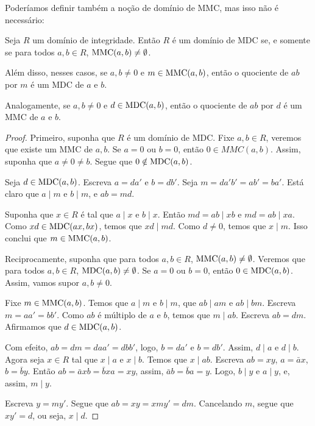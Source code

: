 Poderíamos definir também a noção de domínio de MMC, mas isso não é necessário:

\begin{prop}
    Seja $R$ um domínio de integridade.
    Então $R$ é um domínio de MDC se, e somente se para todos $a, b \in R$, $\operatorname{MMC}(a, b)\neq \emptyset$.

    Além disso, nesses casos, se $a, b \neq 0$ e $m\in \operatorname{MMC}(a, b)$, então o quociente de $ab$ por $m$ é um MDC de $a$ e $b$.

    Analogamente, se $a, b \neq 0$ e $d\in \operatorname{MDC}(a, b)$, então o quociente de $ab$ por $d$ é um MMC de $a$ e $b$.
\end{prop}

\begin{proof}
    Primeiro, suponha que $R$ é um domínio de MDC.
    Fixe $a, b \in R$,
    veremos que existe um MMC de $a, b$.
    Se $a=0$ ou $b=0$, então $0 \in MMC(a, b)$.
    Assim, suponha que $a\neq 0\neq b$.
    Segue que $0 \notin \operatorname{MDC}(a, b)$.

    Seja $d \in \operatorname{MDC}(a, b)$.
    Escreva $a=da'$ e $b=db'$.
    Seja $m=da'b'=ab'=ba'$.
    Está claro que $a\mid m$ e $b\mid m$, e $ab=md$.

    Suponha que $x\in R$ é tal que $a\mid x$ e $b\mid x$.
    Então $md=ab\mid xb$ e $md=ab\mid xa$.
    Como $xd\in \operatorname{MDC}(ax, bx)$, temos que $xd\mid md$.
    Como $d\neq 0$, temos que $x\mid m$.
    Isso conclui que $m \in \operatorname{MMC}(a, b)$.

    Reciprocamente, suponha que para todos $a, b \in R$, $\operatorname{MMC}(a, b)\neq \emptyset$. Veremos que para todos $a, b \in R$, $\operatorname{MDC}(a, b)\neq \emptyset$.
    Se $a=0$ ou $b=0$, então $0 \in \operatorname{MDC}(a, b)$.
    Assim, vamos supor $a, b \neq 0$.

    Fixe $m \in \operatorname{MMC}(a, b)$.
    Temos que $a\mid m$ e $b\mid m$, que $ab\mid am$ e $ab\mid bm$.
    Escreva $m=aa'=bb'$.
    Como $ab$ é múltiplo de $a$ e $b$, temos que $m\mid ab$.
    Escreva $ab=dm$.
    Afirmamos que $d \in \operatorname{MDC}(a, b)$.
    
    Com efeito, $ab=dm=daa'=dbb'$, logo, $b=da'$ e $b=db'$.
    Assim, $d\mid a$ e $d\mid b$.
    Agora seja $x\in R$ tal que $x\mid a$ e $x\mid b$.
    Temos que $x\mid ab$.
    Escreva $ab=xy$, $a=\bar ax$, $b=\bar by$.
    Então $ab=\bar axb=\bar bxa=xy$, assim, $\bar ab=\bar ba=y$.
    Logo, $b\mid y$ e $a\mid y$, e, assim, $m\mid y$.

    Escreva $y=my'$.
    Segue que $ab=xy=xmy'=dm$.
    Cancelando $m$, segue que $xy'=d$, ou seja, $x\mid d$.
\end{proof}

